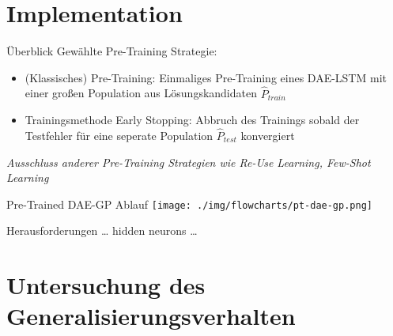 \documentclass[
  ignorenonframetext,
]{beamer}
\begin{document}
\hypertarget{implementation}{%
\section{Implementation}\label{implementation}}

\begin{frame}{Überblick}
\protect\hypertarget{uxfcberblick}{}
Gewählte Pre-Training Strategie:

\begin{itemize}
\item
  (Klassisches) Pre-Training: Einmaliges Pre-Training eines DAE-LSTM mit
  einer großen Population aus Lösungskandidaten \(\hat{P}_{train}\)
\item
  Trainingsmethode Early Stopping: Abbruch des Trainings sobald der
  Testfehler für eine seperate Population \(\hat{P}_{test}\) konvergiert
\end{itemize}

\emph{Ausschluss anderer Pre-Training Strategien wie Re-Use Learning,
Few-Shot Learning}
\end{frame}

\begin{frame}{Pre-Trained DAE-GP Ablauf}
\protect\hypertarget{pre-trained-dae-gp-ablauf}{}
\texttt{[image: ./img/flowcharts/pt-dae-gp.png]}
\end{frame}

\begin{frame}{Herausforderungen}
\protect\hypertarget{herausforderungen}{}
\ldots{} hidden neurons \ldots{}
\end{frame}

\hypertarget{untersuchung-des-generalisierungsverhalten}{%
\section{Untersuchung des
Generalisierungsverhalten}\label{untersuchung-des-generalisierungsverhalten}}
\end{document}
